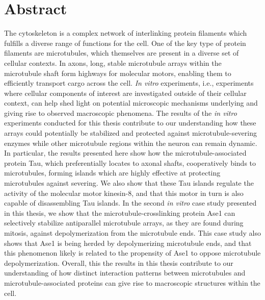 \chapter*{Abstract}
The cytoskeleton is a complex network of interlinking protein filaments which fulfills a diverse range of functions for the cell. One of the key type of protein filaments are microtubules, which themselves are present in a diverse set of cellular contexts. In axons, long, stable microtubule arrays within the microtubule shaft form highways for molecular motors, enabling them to efficiently transport cargo across the cell. \textit{In vitro} experiments, i.e., experiments where cellular components of interest are investigated outside of their cellular context, can help shed light on potential microscopic mechanisms underlying and giving rise to observed macroscopic phenomena. The results of the \textit{in vitro} experiments conducted for this thesis contribute to our understanding how these arrays could potentially be stabilized and protected against microtubule-severing enzymes while other microtubule regions within the neuron can remain dynamic. In particular, the results presented here show how the microtubule-associated protein Tau, which preferentially locates to axonal shafts, cooperatively binds to microtubules, forming islands which are highly effective at protecting microtubules against severing. We also show that these Tau islands regulate the activity of the molecular motor kinesin-8, and that this motor in turn is also capable of disassembling Tau islands. In the second \textit{in vitro} case study presented in this thesis, we show that the microtubule-crosslinking protein Ase1 can selectively stabilize antiparallel microtubule arrays, as they are found during mitosis, against depolymerization from the microtubule ends. This case study also shows that Ase1 is being herded by depolymerizing microtubule ends, and that this phenomenon likely is related to the propensity of Ase1 to oppose microtubule depolymerization. Overall, this the results in this thesis contribute to our understanding of how distinct interaction patterns between microtubules and microtubule-associated proteins can give rise to macroscopic structures within the cell.